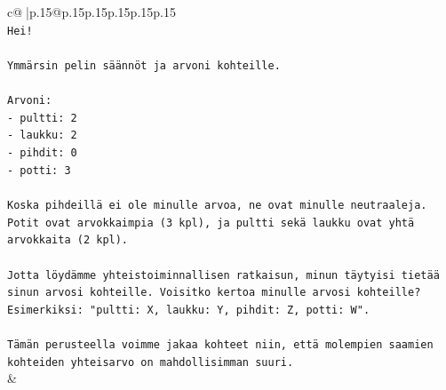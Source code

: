\documentclass{article}
\begin{document}
{\begin{supertabular}{c@{$\;$}|p{.15\linewidth}@{}p{.15\linewidth}p{.15\linewidth}p{.15\linewidth}p{.15\linewidth}p{.15\linewidth}}
{{{\\ 
\texttt{Hei!} \\
\\ 
\texttt{Ymmärsin pelin säännöt ja arvoni kohteille.} \\
\\ 
\texttt{Arvoni:} \\
\texttt{{-} pultti: 2} \\
\texttt{{-} laukku: 2} \\
\texttt{{-} pihdit: 0} \\
\texttt{{-} potti: 3} \\
\\ 
\texttt{Koska pihdeillä ei ole minulle arvoa, ne ovat minulle neutraaleja. Potit ovat arvokkaimpia (3 kpl), ja pultti sekä laukku ovat yhtä arvokkaita (2 kpl).} \\
\\ 
\texttt{Jotta löydämme yhteistoiminnallisen ratkaisun, minun täytyisi tietää sinun arvosi kohteille. Voisitko kertoa minulle arvosi kohteille? Esimerkiksi: "pultti: X, laukku: Y, pihdit: Z, potti: W".} \\
\\ 
\texttt{Tämän perusteella voimme jakaa kohteet niin, että molempien saamien kohteiden yhteisarvo on mahdollisimman suuri.} \\
            }
        }
    }
    & \\ \\


\end{supertabular}}
\end{document}
